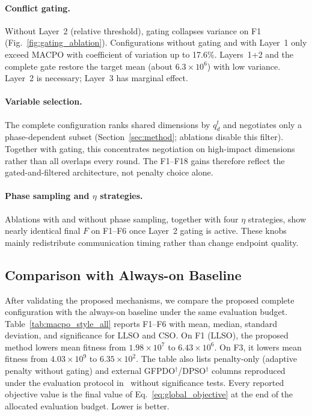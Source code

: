 \documentclass[conference]{IEEEtran}
\begin{document}
\paragraph{Conflict gating.} Without Layer~2 (relative threshold), gating collapses variance on F1 (Fig.~\ref{fig:gating_ablation}). Configurations without gating and with Layer~1 only exceed MACPO with coefficient of variation up to 17.6\%. Layers~1+2 and the complete gate restore the target mean (about $6.3\times10^6$) with low variance. Layer~2 is necessary; Layer~3 has marginal effect.

\paragraph{Variable selection.} The complete configuration ranks shared dimensions by $q_d^t$ and negotiates only a phase-dependent subset (Section~\ref{sec:method}; ablations disable this filter). Together with gating, this concentrates negotiation on high-impact dimensions rather than all overlaps every round. The F1--F18 gains therefore reflect the gated-and-filtered architecture, not penalty choice alone.

\paragraph{Phase sampling and $\eta$ strategies.} Ablations with and without phase sampling, together with four $\eta$ strategies, show nearly identical final $F$ on F1--F6 once Layer~2 gating is active. These knobs mainly redistribute communication timing rather than change endpoint quality.

\subsection{Comparison with Always-on Baseline}\label{sec:exp_main}\label{sec:exp_q1}
After validating the proposed mechanisms, we compare the proposed complete configuration with the always-on baseline under the same evaluation budget. Table~\ref{tab:macpo_style_all} reports F1--F6 with mean, median, standard deviation, and significance for LLSO and CSO. On F1 (LLSO), the proposed method lowers mean fitness from $1.98\times10^7$ to $6.43\times10^6$. On F3, it lowers mean fitness from $4.03\times10^9$ to $6.35\times10^2$. The table also lists penalty-only (adaptive penalty without gating) and external GFPDO$^{\dagger}$/DPSO$^{\dagger}$ columns reproduced under the evaluation protocol in~\cite{ref_macpo} without significance tests. Every reported objective value is the final value of Eq.~\eqref{eq:global_objective} at the end of the allocated evaluation budget. Lower is better.
\end{document}
